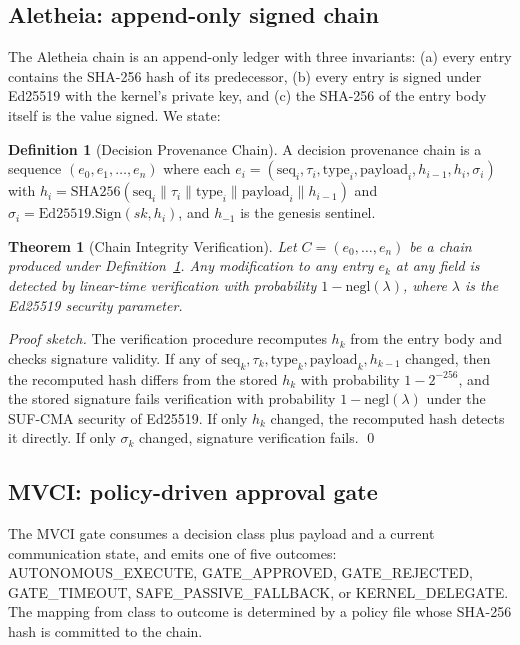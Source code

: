 \documentclass[conference]{IEEEtran}
\theoremstyle{definition}
\newtheorem{definition}{Definition}
\theoremstyle{plain}
\newtheorem{theorem}{Theorem}
\theoremstyle{remark}
\begin{document}
\subsection{Aletheia: append-only signed chain}

The Aletheia chain is an append-only ledger with three invariants: (a) every entry contains the SHA-256 hash of its predecessor, (b) every entry is signed under Ed25519 with the kernel's private key, and (c) the SHA-256 of the entry body itself is the value signed. We state:

\begin{definition}[Decision Provenance Chain]
\label{def:chain}
A decision provenance chain is a sequence $(e_0, e_1, \ldots, e_n)$ where each $e_i = (\text{seq}_i, \tau_i, \text{type}_i, \text{payload}_i, h_{i-1}, h_i, \sigma_i)$ with $h_i = \text{SHA256}(\text{seq}_i \| \tau_i \| \text{type}_i \| \text{payload}_i \| h_{i-1})$ and $\sigma_i = \text{Ed25519.Sign}(sk, h_i)$, and $h_{-1}$ is the genesis sentinel.
\end{definition}

\begin{theorem}[Chain Integrity Verification]
\label{thm:chain}
Let $C = (e_0, \ldots, e_n)$ be a chain produced under Definition~\ref{def:chain}. Any modification to any entry $e_k$ at any field is detected by linear-time verification with probability $1 - \mathrm{negl}(\lambda)$, where $\lambda$ is the Ed25519 security parameter.
\end{theorem}

\begin{proof}[Proof sketch]
The verification procedure recomputes $h_k$ from the entry body and checks signature validity. If any of $\text{seq}_k, \tau_k, \text{type}_k, \text{payload}_k, h_{k-1}$ changed, then the recomputed hash differs from the stored $h_k$ with probability $1 - 2^{-256}$, and the stored signature fails verification with probability $1 - \mathrm{negl}(\lambda)$ under the SUF-CMA security of Ed25519. If only $h_k$ changed, the recomputed hash detects it directly. If only $\sigma_k$ changed, signature verification fails. \qed
\end{proof}

\subsection{MVCI: policy-driven approval gate}

The MVCI gate consumes a decision class plus payload and a current communication state, and emits one of five outcomes: AUTONOMOUS\_EXECUTE, GATE\_APPROVED, GATE\_REJECTED, GATE\_TIMEOUT, SAFE\_PASSIVE\_FALLBACK, or KERNEL\_DELEGATE. The mapping from class to outcome is determined by a policy file whose SHA-256 hash is committed to the chain.
\end{document}
